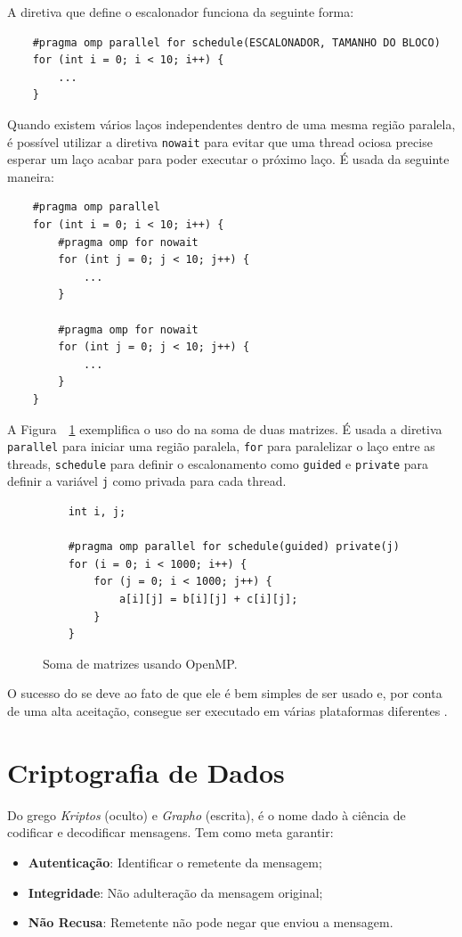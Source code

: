 A diretiva que define o escalonador funciona da seguinte forma:
\begin{lstlisting}
    #pragma omp parallel for schedule(ESCALONADOR, TAMANHO DO BLOCO)
    for (int i = 0; i < 10; i++) {
        ...
    }
\end{lstlisting}

Quando existem vários laços independentes dentro de uma mesma região paralela, é possível utilizar a diretiva \texttt{nowait} para evitar que uma thread ociosa precise esperar um laço acabar para poder executar o próximo laço.
É usada da seguinte maneira:
\begin{lstlisting}
    #pragma omp parallel
    for (int i = 0; i < 10; i++) {
        #pragma omp for nowait
        for (int j = 0; j < 10; j++) {
            ...
        }
        
        #pragma omp for nowait
        for (int j = 0; j < 10; j++) {
            ...
        }
    }
\end{lstlisting}

A Figura~~\ref{fig:lstopenmp} exemplifica o uso do \openMP na soma de duas matrizes. É usada a diretiva \texttt{parallel} para iniciar uma região paralela, \texttt{for} para paralelizar o laço entre as threads, \texttt{schedule} para definir o escalonamento como \texttt{guided} e \texttt{private} para definir a variável \texttt{j} como privada para cada thread. 

\begin{figure}[t]
    \centering
    \begin{lstlisting}
    int i, j;
    
    #pragma omp parallel for schedule(guided) private(j)
    for (i = 0; i < 1000; i++) {
        for (j = 0; i < 1000; j++) {
            a[i][j] = b[i][j] + c[i][j];
        }
    }
    \end{lstlisting}
    \caption{Soma de matrizes usando OpenMP.}
    \label{fig:lstopenmp}
\end{figure}

O sucesso do \openMP se deve ao fato de que ele é bem simples de ser usado e, por conta de uma alta aceitação, consegue ser executado em várias plataformas diferentes \cite{Chapman2008}.

\section{Criptografia de Dados}

Do grego \textit{Kriptos} (oculto) e \textit{Grapho} (escrita), é o nome dado à ciência de codificar e decodificar mensagens. Tem como meta garantir:
\begin{itemize}
    \item \textbf{Autenticação}: Identificar o remetente da mensagem;
    \item \textbf{Integridade}: Não adulteração da mensagem original;
    \item \textbf{Não Recusa}: Remetente não pode negar que enviou a mensagem.
\end{itemize}

